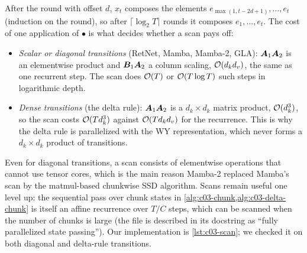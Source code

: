 After the round with offset $d$, $x_t$ composes the elements $e_{\max(1,t-2d+1)},\dots,e_t$
(induction on the round), so after $\lceil\log_2T\rceil$ rounds it composes $e_1,\dots,e_t$. The
cost of one application of $\bullet$ is what decides whether a scan pays off:
\begin{itemize}
\item \emph{Scalar or diagonal transitions} (RetNet, Mamba, Mamba-2, GLA): $\bm{A}_1\bm{A}_2$ is an
elementwise product and $\bm{B}_1\bm{A}_2$ a column scaling, $\mathcal{O}(d_kd_v)$, the same as one
recurrent step. The scan does $\mathcal{O}(T)$ or $\mathcal{O}(T\log T)$ such steps in logarithmic depth.
\item \emph{Dense transitions} (the delta rule): $\bm{A}_1\bm{A}_2$ is a $d_k\times d_k$ matrix
product, $\mathcal{O}(d_k^3)$, so the scan costs $\mathcal{O}(Td_k^3)$ against $\mathcal{O}(Td_kd_v)$ for the
recurrence. This is why the delta rule is parallelized with the WY representation, which never
forms a $d_k\times d_k$ product of transitions.
\end{itemize}
Even for diagonal transitions, a scan consists of elementwise operations that cannot use tensor
cores, which is the main reason Mamba-2 replaced Mamba's scan by the matmul-based chunkwise SSD
algorithm. Scans remain useful one level up: the sequential pass over chunk states in
\cref{alg:c03-chunk,alg:c03-delta-chunk} is itself an affine recurrence over $T/C$ steps, which
can be scanned when the number of chunks is large (the \fla{} file
 is
described in its docstring as ``fully parallelized state passing''). Our implementation is
\cref{lst:c03-scan}; we checked it on both diagonal and delta-rule transitions.

